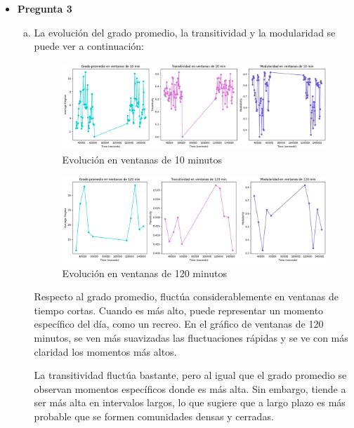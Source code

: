 \documentclass[10pt]{article}
\begin{document}
\begin{itemize}
    \item \textbf{Pregunta 3}
        \begin{enumerate}[(a)]
            \item La evolución del grado promedio, la transitividad y la modularidad se puede ver a continuación:
            \begin{figure}[H]
                \centering
                \includegraphics[scale=0.4]{images/10min.png}
                \caption{Evolución en ventanas de 10 minutos}
                \label{fig:grafico_10min}
            \end{figure}

            \begin{figure}[H]
                \centering
                \includegraphics[scale=0.4]{images/120min.png}
                \caption{Evolución en ventanas de 120 minutos}
                \label{fig:grafico_120min}
            \end{figure}

            Respecto al grado promedio, fluctúa considerablemente en ventanas de tiempo cortas. Cuando es más alto, puede representar un momento específico del día, como un recreo. En el gráfico de ventanas de 120 minutos, se ven más suavizadas las fluctuaciones rápidas y se ve con más claridad los momentos más altos. 

            La transitividad fluctúa bastante, pero al igual que el grado promedio se observan momentos específicos donde es más alta. Sin embargo, tiende a ser más alta en intervalos largos, lo que sugiere que a largo plazo es más probable que se formen comunidades densas y cerradas.


\end{enumerate}
\end{itemize}
\end{document}
